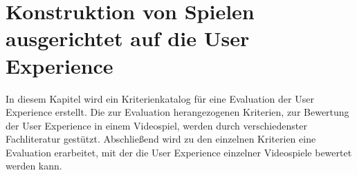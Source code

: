 \chapter{Konstruktion von Spielen ausgerichtet auf die User Experience}
\label{Kapitel:uxInSpielen}


In diesem Kapitel wird ein Kriterienkatalog für eine Evaluation der User Experience erstellt. Die zur Evaluation herangezogenen Kriterien, zur Bewertung der User Experience in einem Videospiel, werden durch verschiedenster Fachliteratur gestützt. Abschließend wird zu den einzelnen Kriterien eine Evaluation erarbeitet, mit der die User Experience einzelner Videospiele bewertet werden kann.

%
%
%
%
%
%
%








